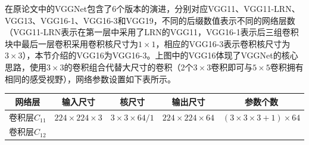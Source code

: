 \documentclass[12pt,a4paper,UTF8,twoside]{book}
\begin{document}
\hspace{0pt}在原论文中的VGGNet包含了6个版本的演进，分别对应VGG11、VGG11-LRN、VGG13、VGG16-1、VGG16-3和VGG19，不同的后缀数值表示不同的网络层数（VGG11-LRN表示在第一层中采用了LRN的VGG11，VGG16-1表示后三组卷积块中最后一层卷积采用卷积核尺寸为\(1\times1\)，相应的VGG16-3表示卷积核尺寸为\(3\times3\)），本节介绍的VGG16为VGG16-3。上图中的VGG16体现了VGGNet的核心思路，使用\(3\times3\)的卷积组合代替大尺寸的卷积（2个\(3\times3卷积即可与\)\(5\times5\)卷积拥有相同的感受视野），网络参数设置如下表所示。

\begin{longtable}[]{@{}ccccc@{}}
\toprule
\begin{minipage}[b]{0.17\columnwidth}\centering
网络层\strut
\end{minipage} & \begin{minipage}[b]{0.17\columnwidth}\centering
输入尺寸\strut
\end{minipage} & \begin{minipage}[b]{0.17\columnwidth}\centering
核尺寸\strut
\end{minipage} & \begin{minipage}[b]{0.17\columnwidth}\centering
输出尺寸\strut
\end{minipage} & \begin{minipage}[b]{0.17\columnwidth}\centering
参数个数\strut
\end{minipage}\tabularnewline
\midrule
\endhead
\begin{minipage}[t]{0.17\columnwidth}\centering
卷积层\(C_{11}\)\strut
\end{minipage} & \begin{minipage}[t]{0.17\columnwidth}\centering
\(224\times224\times3\)\strut
\end{minipage} & \begin{minipage}[t]{0.17\columnwidth}\centering
\(3\times3\times64/1\)\strut
\end{minipage} & \begin{minipage}[t]{0.17\columnwidth}\centering
\(224\times224\times64\)\strut
\end{minipage} & \begin{minipage}[t]{0.17\columnwidth}\centering
\((3\times3\times3+1)\times64\)\strut
\end{minipage}\tabularnewline
\begin{minipage}[t]{0.17\columnwidth}\centering
卷积层\(C_{12}\)\strut
\end{minipage} & \begin{minipage}[t]{0.17\columnwidth}\centering

\end{minipage}
\end{longtable}
\end{document}
